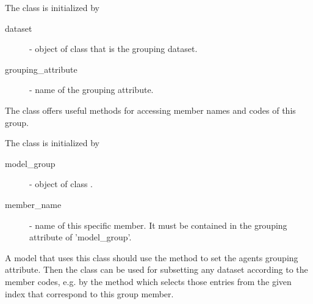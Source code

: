 The class  is initialized by
\begin{description}
\item[dataset] - object of class  that is the grouping dataset.
\item[grouping_attribute] - name of the grouping attribute.
\end{description}
The class offers useful methods for accessing member names and codes of this group.

The class  is initialized by
\begin{description}
\item[model_group] - object of class .
\item[member_name] - name of this specific member. It must be contained in the grouping attribute of 'model_group'.
\end{description}
A model that uses this class should use the method  to set
the agents grouping attribute. Then the class can be used for subsetting any dataset according to the member codes,
e.g. by the method  which selects those entries from the given index that
correspond to this group member.

